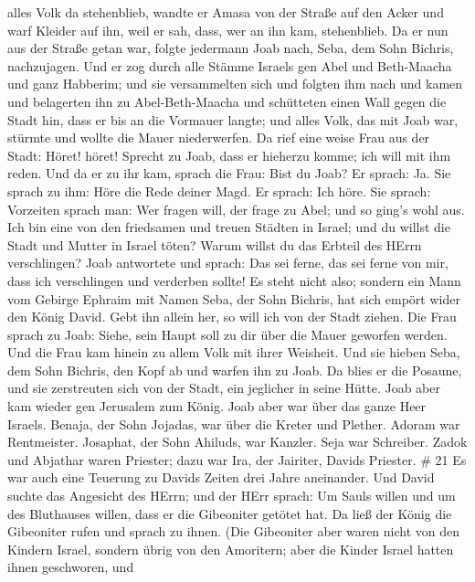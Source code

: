 alles Volk da stehenblieb, wandte er Amasa von der Straße auf den Acker
und warf Kleider auf ihn, weil er sah, dass, wer an ihn kam,
stehenblieb.  Da er nun aus der Straße getan war, folgte
jedermann Joab nach, Seba, dem Sohn Bichris, nachzujagen. 
Und er zog durch alle Stämme Israels gen Abel und Beth-Maacha und ganz
Habberim; und sie versammelten sich und folgten ihm nach 
und kamen und belagerten ihn zu Abel-Beth-Maacha und schütteten einen
Wall gegen die Stadt hin, dass er bis an die Vormauer langte; und alles
Volk, das mit Joab war, stürmte und wollte die Mauer niederwerfen.
 Da rief eine weise Frau aus der Stadt: Höret! höret!
Sprecht zu Joab, dass er hieherzu komme; ich will mit ihm reden.
 Und da er zu ihr kam, sprach die Frau: Bist du Joab? Er
sprach: Ja. Sie sprach zu ihm: Höre die Rede deiner Magd. Er sprach: Ich
höre.  Sie sprach: Vorzeiten sprach man: Wer fragen will,
der frage zu Abel; und so ging's wohl aus.  Ich bin eine
von den friedsamen und treuen Städten in Israel; und du willst die Stadt
und Mutter in Israel töten? Warum willst du das Erbteil des HErrn
verschlingen?  Joab antwortete und sprach: Das sei ferne,
das sei ferne von mir, dass ich verschlingen und verderben sollte! Es
steht nicht also;  sondern ein Mann vom Gebirge Ephraim mit
Namen Seba, der Sohn Bichris, hat sich empört wider den König David.
Gebt ihn allein her, so will ich von der Stadt ziehen. Die Frau sprach
zu Joab: Siehe, sein Haupt soll zu dir über die Mauer geworfen werden.
 Und die Frau kam hinein zu allem Volk mit ihrer Weisheit.
Und sie hieben Seba, dem Sohn Bichris, den Kopf ab und warfen ihn zu
Joab. Da blies er die Posaune, und sie zerstreuten sich von der Stadt,
ein jeglicher in seine Hütte. Joab aber kam wieder gen Jerusalem zum
König.  Joab aber war über das ganze Heer Israels. Benaja,
der Sohn Jojadas, war über die Kreter und Plether.  Adoram
war Rentmeister. Josaphat, der Sohn Ahiluds, war Kanzler. 
Seja war Schreiber. Zadok und Abjathar waren Priester; 
dazu war Ira, der Jairiter, Davids Priester. \# 21  Es war
auch eine Teuerung zu Davids Zeiten drei Jahre aneinander. Und David
suchte das Angesicht des HErrn; und der HErr sprach: Um Sauls willen und
um des Bluthauses willen, dass er die Gibeoniter getötet hat.
 Da ließ der König die Gibeoniter rufen und sprach zu ihnen.
(Die Gibeoniter aber waren nicht von den Kindern Israel, sondern übrig
von den Amoritern; aber die Kinder Israel hatten ihnen geschworen, und
